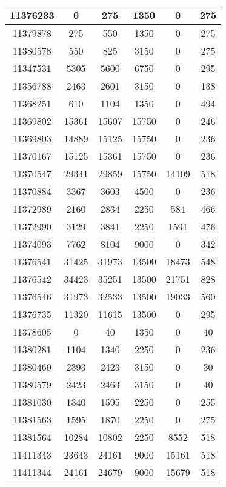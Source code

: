 \begin{appendices}
\begin{center}
\begin{longtable}{|c|c|c|c|c|c|}
11376233 & 0     & 275   & 1350  & 0     & 275  \\ \hline
11379878 & 275   & 550   & 1350  & 0     & 275  \\ \hline
11380578 & 550   & 825   & 3150  & 0     & 275  \\ \hline
11347531 & 5305  & 5600  & 6750  & 0     & 295 \\ \hline
11356788 & 2463  & 2601  & 3150  & 0     & 138 \\ \hline
11368251 & 610   & 1104  & 1350  & 0     & 494 \\ \hline
11369802 & 15361 & 15607 & 15750 & 0     & 246 \\ \hline
11369803 & 14889 & 15125 & 15750 & 0     & 236 \\ \hline
11370167 & 15125 & 15361 & 15750 & 0     & 236 \\ \hline
11370547 & 29341 & 29859 & 15750 & 14109 & 518 \\ \hline
11370884 & 3367  & 3603  & 4500  & 0     & 236 \\ \hline
11372989 & 2160  & 2834  & 2250  & 584   & 466 \\ \hline
11372990 & 3129  & 3841  & 2250  & 1591  & 476 \\ \hline
11374093 & 7762  & 8104  & 9000  & 0     & 342 \\ \hline
11376541 & 31425 & 31973 & 13500 & 18473 & 548 \\ \hline
11376542 & 34423 & 35251 & 13500 & 21751 & 828 \\ \hline
11376546 & 31973 & 32533 & 13500 & 19033 & 560 \\ \hline
11376735 & 11320 & 11615 & 13500 & 0     & 295 \\ \hline
11378605 & 0     & 40    & 1350  & 0     & 40  \\ \hline
11380281 & 1104  & 1340  & 2250  & 0     & 236 \\ \hline
11380460 & 2393  & 2423  & 3150  & 0     & 30  \\ \hline
11380579 & 2423  & 2463  & 3150  & 0     & 40  \\ \hline
11381030 & 1340  & 1595  & 2250  & 0     & 255 \\ \hline
11381563 & 1595  & 1870  & 2250  & 0     & 275 \\ \hline
11381564 & 10284 & 10802 & 2250  & 8552  & 518 \\ \hline
11411343 & 23643 & 24161 & 9000  & 15161 & 518 \\ \hline
11411344 & 24161 & 24679 & 9000  & 15679 & 518 \\ \hline

\end{longtable}
\end{center}
\end{appendices}
